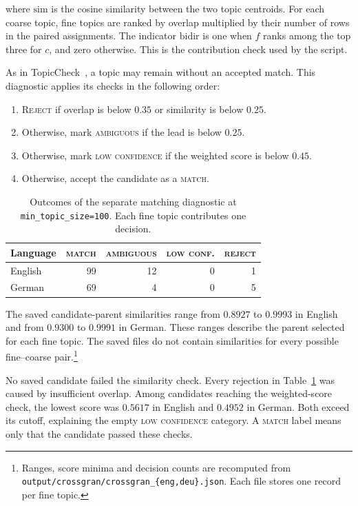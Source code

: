 where $\mathrm{sim}$ is the cosine similarity between the two topic centroids. For each coarse
topic, fine topics are ranked by overlap multiplied by their number of rows in the paired
assignments. The indicator $\mathrm{bidir}$ is one when $f$ ranks among the top three for $c$, and zero
otherwise. This is the contribution check used by the script.

As in TopicCheck~\cite[pp.~177--178]{chuang2015topiccheck}, a topic may remain without an
accepted match. This diagnostic applies its checks in the following order:
\begin{enumerate}[leftmargin=1.6em,itemsep=2pt]
\item \textsc{Reject} if overlap is below $0.35$ or similarity is below $0.25$.
\item Otherwise, mark \textsc{ambiguous} if the lead is below $0.25$.
\item Otherwise, mark \textsc{low confidence} if the weighted score is below $0.45$.
\item Otherwise, accept the candidate as a \textsc{match}.
\end{enumerate}

\begin{table}[h]\centering
\caption{Outcomes of the separate matching diagnostic at \texttt{min\_topic\_size=100}.
Each fine topic contributes one decision.}
\label{tab:crossgran}
\begin{tabular}{lrrrr}
\toprule
Language & \textsc{match} & \textsc{ambiguous} & \textsc{low conf.} & \textsc{reject} \\
\midrule
English & 99 & 12 & 0 & 1 \\
German  & 69 & 4  & 0 & 5 \\
\bottomrule
\end{tabular}
\end{table}

\measured{} The saved candidate-parent similarities range from $0.8927$ to $0.9993$ in English
and from $0.9300$ to $0.9991$ in German. These ranges describe the parent selected for each fine
topic. The saved files do not contain similarities for every possible fine--coarse pair.\footnote{\raggedright
Ranges, score minima and decision counts are recomputed from
\texttt{output/crossgran/}\allowbreak\texttt{crossgran\_\{eng,deu\}.json}.
Each file stores one record per fine topic.}

\measured{} No saved candidate failed the similarity check. Every rejection in
Table~\ref{tab:crossgran} was caused by insufficient overlap. Among candidates reaching the
weighted-score check, the lowest score was $0.5617$ in English and $0.4952$ in German.
Both exceed its cutoff, explaining the empty \textsc{low confidence} category. A
\textsc{match} label means only that the candidate passed these checks.

